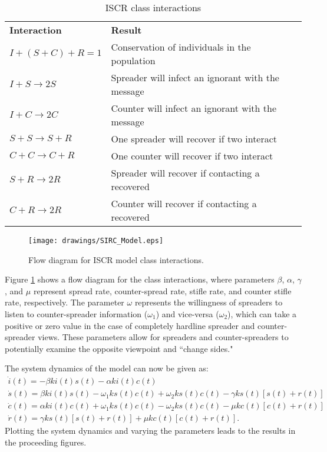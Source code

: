 \begin{table}[!htbp] \centering
\centering

\begin{tabular}{ll}
\textbf{Interaction}    & \textbf{Result}                                   \\
$I + (S + C) + R = 1$     & Conservation of individuals in the population     \\
$I + S \rightarrow 2S$    & Spreader will infect an ignorant with the message \\
$I + C \rightarrow 2C$    & Counter will infect an ignorant with the message  \\
$S + S \rightarrow S + R$ & One spreader will recover if two interact         \\
$C + C \rightarrow C + R$ & One counter will recover if two interact          \\
$S + R \rightarrow 2R$    & Spreader will recover if contacting a recovered   \\
$C + R \rightarrow 2R$    & Counter will recover if contacting a recovered   
\end{tabular}
\caption{ISCR class interactions}
\label{tab:sirc_interactions}
\end{table}
\begin{figure}[!htbp] \centering
  \texttt{[image: drawings/SIRC\_Model.eps]}
  \caption{Flow diagram for ISCR model class interactions.}
  \label{fig:sirc_flow}
\end{figure}

Figure \ref{fig:sirc_flow} shows a flow diagram for the class interactions, where parameters $\beta$, $\alpha$, $\gamma$, and $\mu$ represent spread rate, counter-spread rate, stifle rate, and counter stifle rate, respectively. The parameter $\omega$ represents the willingness of spreaders to listen to counter-spreader information ($\omega_1$) and vice-versa ($\omega_2$), which can take a positive or zero value in the case of completely hardline spreader and counter-spreader views. These parameters allow for spreaders and counter-spreaders to potentially examine the opposite viewpoint and ``change sides."

\noindent The system dynamics of the model can now be given as:
\begin{equation}\label{eqn:SIRC_dynamics}
\left.\begin{aligned}
\dot{i}(t) = -\beta k i(t)s(t) - \alpha k i(t)c(t)\\
\dot{s}(t) = \beta k i(t)s(t) - \omega_1 k s(t)c(t) + \omega_2 k s(t)c(t) - \gamma k s(t)[s(t)+r(t)]\\
\dot{c}(t) = \alpha k i(t)c(t) + \omega_1 k s(t)c(t) - \omega_2 k s(t)c(t) - \mu k c(t)[c(t)+r(t)]\\
\dot{r}(t) = \gamma k s(t)[s(t)+r(t)] + \mu k c(t)[c(t)+r(t)].
\end{aligned}\right.
\end{equation}
\noindent Plotting the system dynamics and varying the parameters leads to the results in the proceeding figures.

